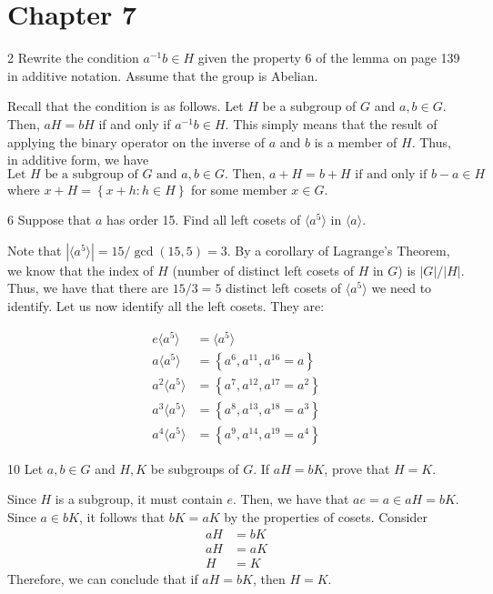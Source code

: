 \section*{Chapter 7}

\begin{hwproblem}
{2}{
    Rewrite the condition \(a^{-1}b \in H\) given the property 6 of the lemma on page 139 in additive notation. Assume that the group is Abelian.
}

Recall that the condition is as follows. Let \(H\) be a subgroup of \(G\) and \(a, b \in G\). Then, \(aH = bH\) if and only if \(a^{-1}b \in H\). This simply means that the result of applying the binary operator on the inverse of \(a\) and \(b\) is a member of \(H\). Thus, in additive form, we have
\[
    \text{Let \(H\) be a subgroup of \(G\) and \(a, b \in G\). Then, \(a+H = b+H\) if and only if \(b-a \in H\)}
\]
where \(x+H = \left\{x + h : h \in H\right\}\) for some member \(x \in G\).
\end{hwproblem}

\begin{hwproblem}
{6}{
    Suppose that \(a\) has order 15. Find all left cosets of \(\langle a^5 \rangle\) in \(\langle a \rangle\).
}

Note that \(|\langle a^5 \rangle| = 15/\gcd(15, 5) = 3\). By a corollary of Lagrange's Theorem, we know that the index of \(H\) (number of distinct left cosets of \(H\) in \(G\)) is \(|G| / |H|\). Thus, we have that there are \(15 / 3 = 5\) distinct left cosets of \(\langle a^5 \rangle\) we need to identify. Let us now identify all the left cosets. They are:

\[
\begin{aligned}
    e \langle a^5 \rangle &= \langle a^5 \rangle \\
    a \langle a^5 \rangle &= \left\{a^6, a^11, a^16 = a\right\} \\
    a^2 \langle a^5 \rangle &= \left\{a^7, a^12, a^17 = a^2\right\} \\
    a^3 \langle a^5 \rangle &= \left\{a^8, a^13, a^18 = a^3\right\} \\
    a^4 \langle a^5 \rangle &= \left\{a^9, a^14, a^19 = a^4\right\}
\end{aligned}
\]
\end{hwproblem}

\newpage
\begin{hwproblem}
{10}{
    Let \(a, b \in G\) and \(H, K\) be subgroups of \(G\). If \(aH = bK\), prove that \(H = K\).
}

Since \(H\) is a subgroup, it must contain \(e\). Then, we have that \(ae = a \in aH = bK\). Since \(a \in bK\), it follows that \(bK = aK\) by the properties of cosets.
Consider
\[
\begin{aligned}
    aH &= bK \\
    aH &= aK \\
    H &= K
\end{aligned}
\]
Therefore, we can conclude that if \(aH = bK\), then \(H = K\).
\end{hwproblem}

